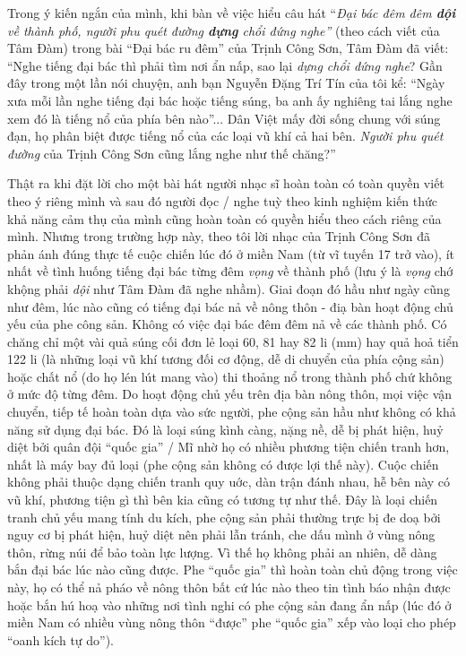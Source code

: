 \documentclass[../main.tex]{subfiles}
\begin{document}
\begin{multicols}{2}

Trong ý kiến ngắn của mình, khi bàn về việc hiểu câu hát “\textit{Đại bác đêm đêm \textbf{dội} về thành phố, người phu quét đường \textbf{dựng} chổi đứng nghe” }(theo cách viết của Tâm Đàm) trong bài “Đại bác ru đêm” của Trịnh Công Sơn, Tâm Đàm đã viết: “Nghe tiếng đại bác thì phải tìm nơi ẩn nấp, sao lại \textit{dựng chổi đứng nghe}? Gần đây trong một lần nói chuyện, anh bạn Nguyễn Đặng Trí Tín của tôi kể: “Ngày xưa mỗi lần nghe tiếng đại bác hoặc tiếng súng, ba anh ấy nghiêng tai lắng nghe xem đó là tiếng nổ của phía bên nào”... Dân Việt mấy đời sống chung với súng đạn, họ phân biệt được tiếng nổ của các loại vũ khí cả hai bên. \textit{Người phu quét đường} của Trịnh Công Sơn cũng lắng nghe như thế chăng?” 
 
Thật ra khi đặt lời cho một bài hát người nhạc sĩ hoàn toàn có toàn quyền viết theo ý riêng mình và sau đó người đọc / nghe tuỳ theo kinh nghiệm kiến thức khả năng cảm thụ của mình cũng hoàn toàn có quyền hiểu theo cách riêng của mình. Nhưng trong trường hợp này, theo tôi lời nhạc của Trịnh Công Sơn đã phản ánh đúng thực tế cuộc chiến lúc đó ở miền Nam (từ vĩ tuyến 17 trở vào), ít nhất về tình huống tiếng đại bác từng đêm \textit{vọng} về thành phố (lưu ý là \textit{vọng} chớ khộng phải \textit{dội} như Tâm Đàm đã nghe nhầm). Giai đoạn đó hầu như ngày cũng như đêm, lúc nào cũng có tiếng đại bác nả về nông thôn - điạ bàn hoạt động chủ yếu của phe công sản. Không có việc đại bác đêm đêm nả về các thành phố. Có chăng chỉ một vài quả súng cối đơn lẻ loại 60, 81 hay 82 li (mm) hay quả hoả tiển 122 li (là những loại vũ khí tương đối cơ động, dễ di chuyển của phía cộng sản) hoặc chất nổ (do họ lén lút mang vào) thi thoảng nổ trong thành phố chứ không ở mức độ từng đêm. Do hoạt động chủ yếu trên địa bàn nông thôn, mọi việc vận chuyển, tiếp tế hoàn toàn dựa vào sức người, phe cộng sản hầu như không có khả năng sử dụng đại bác. Đó là loại súng kình càng, nặng nề, dễ bị phát hiện, huỷ diệt bởi quân đội “quốc gia” / Mĩ nhờ họ có nhiều phương tiện chiến tranh hơn, nhất là máy bay đủ loại (phe cộng sản không có được lợi thế này).  Cuộc chiến không phải thuộc dạng chiến tranh quy uớc, dàn trận đánh nhau, hễ bên này có vũ khí, phương tiện gì thì bên kia cũng có tương tự như thế. Đây là loại chiến tranh chủ yếu mang tính du kích, phe cộng sản phải thường trực bị đe doạ bởi nguy cơ bị phát hiện, huỷ diệt nên phải lẫn tránh, che dấu mình ở vùng nông thôn, rừng núi để bảo toàn lực lượng. Vì thế họ không phải an nhiên, dễ dàng bắn đại bác lúc nào cũng được. Phe “quốc gia” thì hoàn toàn chủ động trong việc này, họ có thể nả pháo về nông thôn bất cứ lúc nào theo tin tình báo nhận được hoặc bắn hú hoạ vào những nơi tình nghi có phe cộng sản đang ẩn nấp (lúc đó ở miền Nam có nhiều vùng nông thôn “được” phe “quốc gia” xếp vào loại cho phép “oanh kích tự do”). 
  

\end{multicols}
\end{document}
